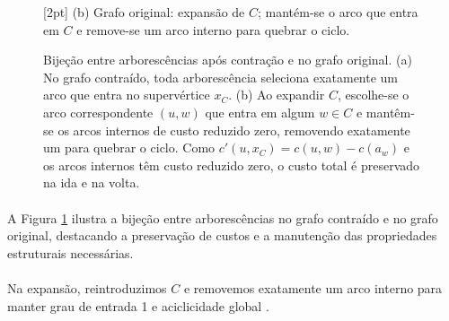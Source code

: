 \documentclass[12pt,a4paper]{article}
\def\\{}%
\def\times{\string x}%
\begin{document}
\begin{figure}[htbp]
\begin{minipage}{.47\textwidth}
        \\[2pt]
        \small (b) Grafo original: expansão de $C$; mantém-se o arco que entra em $C$ e remove-se um arco interno para quebrar o ciclo.
    \end{minipage}
    \caption{Bijeção entre arborescências após contração e no grafo original. (a) No grafo contraído, toda arborescência seleciona exatamente um arco que entra no supervértice $x_C$. (b) Ao expandir $C$, escolhe-se o arco correspondente \((u,w)\) que entra em algum $w\in C$ e mantêm-se os arcos internos de custo reduzido zero, removendo exatamente um para quebrar o ciclo. Como $c'(u,x_C)=c(u,w)-c(a_w)$ e os arcos internos têm custo reduzido zero, o custo total é preservado na ida e na volta.}
    \label{fig:chu-liu-bijection}
\end{figure}

\paragraph{}
A Figura \ref{fig:chu-liu-bijection} ilustra a bijeção entre arborescências no grafo contraído e no grafo original, destacando a preservação de custos e a manutenção das propriedades estruturais necessárias.

\paragraph{}
Na expansão, reintroduzimos \(C\) e removemos exatamente um arco interno para manter grau de entrada 1 e aciclicidade global \cite{schrijver2003comb,kleinberg2006}.
\end{document}
